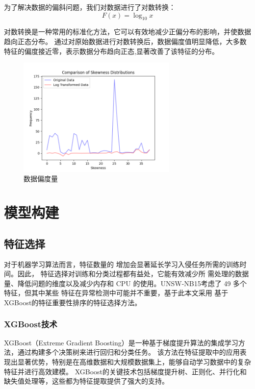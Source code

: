 \documentclass{article}
\begin{document}
为了解决数据的偏斜问题，我们对数据进行了对数转换：
\begin{equation}
 F(x)= \log _{10} x
\end{equation}

对数转换是一种常用的标准化方法，它可以有效地减少正偏分布的影响，并使数据趋向正态分布。
通过对原始数据进行对数转换后，数据偏度值明显降低，大多数特征的偏度接近零，表示数据分布趋向正态,显著改善了该特征的分布。
\begin{figure}[H]
  \centering
  \includegraphics[width=0.7\textwidth]{./png/skewness.png}
  \caption{数据偏度量}
  \label{fig:skew}
\end{figure}



\section{模型构建}
\subsection{特征选择}
对于机器学习算法而言，特征数量的
增加会显著延长学习入侵任务所需的训练时间\cite{ref10}。因此，
特征选择对训练和分类过程都有益处，它能有效减少所
需处理的数据量、降低问题的维度以及减少内存和 CPU 
的使用。UNSW-NB15考虑了 49 多个特征，但其中某些
特征在异常检测中可能并不重要\cite{ref4}，基于此本文采用
基于XGBoost的特征重要性排序的特征选择方法。
\subsubsection{XGBoost技术}
XGBoost（Extreme Gradient Boosting）是一种基于梯度提升算法的集成学习方法，通过构建多个决策树来进行回归和分类任务。
该方法在特征提取中的应用表现出显著优势，特别是在高维数据和大规模数据集上，能够自动学习数据中的复杂特征并进行高效建模。
XGBoost的关键技术包括梯度提升树、正则化、并行化和缺失值处理等，这些都为特征提取提供了强大的支持。
\end{document}
